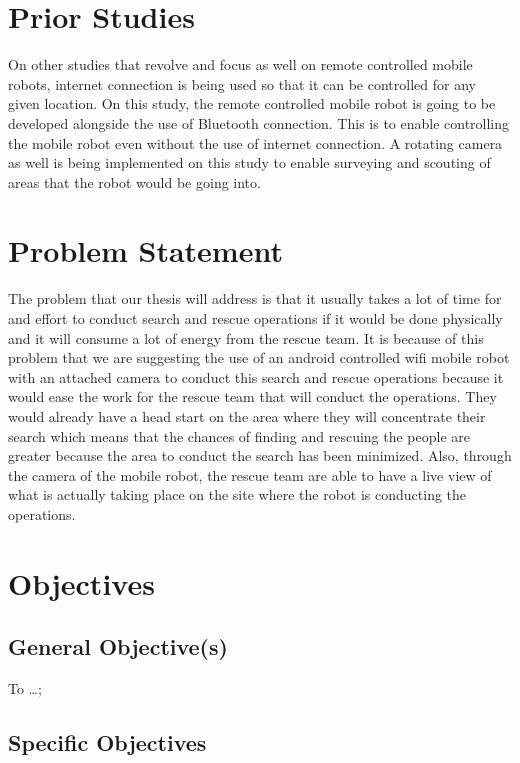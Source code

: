 \section{Prior Studies}

	On other studies that revolve and focus as well on remote controlled mobile robots, internet connection is being used so that it can be controlled for any given location. On this study, the remote controlled mobile robot is going to be developed alongside the use of Bluetooth connection. This is to enable controlling the mobile robot even without the use of internet connection. A rotating camera as well is being implemented on this study to enable surveying and scouting of areas that the robot would be going into. 
\blindtext


\section{Problem Statement}

	The problem that our thesis will address is that it usually takes a lot of time for and effort to conduct search and rescue operations if it would be done physically and it will consume a lot of energy from the rescue team. It is because of this problem that we are suggesting the use of an android controlled wifi mobile robot with an attached camera to conduct this search and rescue operations because it would ease the work for the rescue team that will conduct the operations. They would already have a head start on the area where they will concentrate their search which means that the chances of finding and rescuing the people are greater because the area to conduct the search has been minimized. Also, through the camera of the mobile robot, the rescue team are able to have a live view of what is actually taking place on the site where the robot is conducting the operations.
\blindtext


\section{Objectives}
\subsection{General Objective(s)}
To \ldots;

\subsection{Specific Objectives}

